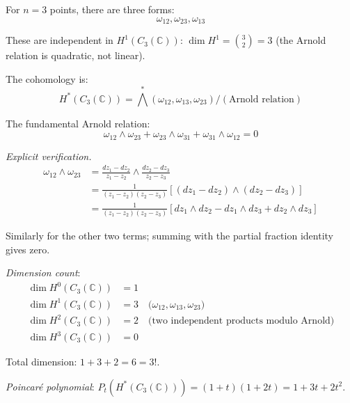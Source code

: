 \begin{example}[\texorpdfstring{$n=3$}{n=3}: the fundamental relation]
\label{ex:arnold-n3-complete}

For $n=3$ points, there are three forms:
\begin{equation}
\omega_{12}, \omega_{23}, \omega_{13}
\end{equation}

These are independent in $H^1(C_3(\mathbb{C}))$: $\dim H^1 = \binom{3}{2} = 3$
(the Arnold relation is quadratic, not linear).

The cohomology is:
\begin{equation}
H^*(C_3(\mathbb{C})) = \bigwedge^*(\omega_{12}, \omega_{13}, \omega_{23}) / (\text{Arnold relation})
\end{equation}

The fundamental Arnold relation:
\begin{equation}
\omega_{12} \wedge \omega_{23} + \omega_{23} \wedge \omega_{31} + \omega_{31} 
\wedge \omega_{12} = 0
\end{equation}

\emph{Explicit verification.}
\begin{align}
\omega_{12} \wedge \omega_{23} &= \frac{dz_1 - dz_2}{z_1 - z_2} \wedge \frac{dz_2 - 
dz_3}{z_2 - z_3}\\
&= \frac{1}{(z_1-z_2)(z_2-z_3)} [(dz_1 - dz_2) \wedge (dz_2 - dz_3)]\\
&= \frac{1}{(z_1-z_2)(z_2-z_3)} [dz_1 \wedge dz_2 - dz_1 \wedge dz_3 + dz_2 \wedge dz_3]
\end{align}

Similarly for the other two terms; summing with the partial fraction identity gives zero.

\emph{Dimension count}:
\begin{align}
\dim H^0(C_3(\mathbb{C})) &= 1\\
\dim H^1(C_3(\mathbb{C})) &= 3 \quad \text{(}\omega_{12}, \omega_{13}, \omega_{23}\text{)}\\
\dim H^2(C_3(\mathbb{C})) &= 2 \quad \text{(two independent products modulo Arnold)}\\
\dim H^3(C_3(\mathbb{C})) &= 0
\end{align}

Total dimension: $1 + 3 + 2 = 6 = 3!$.

\emph{Poincaré polynomial}: $P_t(H^*(C_3(\mathbb{C}))) = (1+t)(1+2t) = 1 + 3t + 2t^2$.
\end{example}

